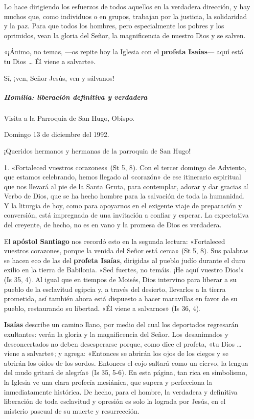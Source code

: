 \documentclass[]{article}
\let\oldsubparagraph\subparagraph
\renewcommand{\subparagraph}[1]{\oldsubparagraph{#1}\mbox{}}
\begin{document}
Lo hace dirigiendo los esfuerzos de todos aquellos en la verdadera
dirección, y hay muchos que, como individuos o en grupos, trabajan por
la justicia, la solidaridad y la paz. Para que todos los hombres, pero
especialmente los pobres y los oprimidos, vean la gloria del Señor, la
magnificencia de nuestro Dios y se salven.

«¡Ánimo, no temas, ---os repite hoy la Iglesia con el \textbf{profeta
Isaías}--- aquí está tu Dios \ldots{} Él viene a salvarte».

Sí, ¡ven, Señor Jesús, ven y sálvanos!

\subparagraph{Homilía: liberación definitiva y
verdadera}\label{homiluxeda-liberaciuxf3n-definitiva-y-verdadera}

Visita a la Parroquia de San Hugo, Obispo.

Domingo 13 de diciembre del 1992.

¡Queridos hermanos y hermanas de la parroquia de San Hugo!

1. «Fortaleced vuestros corazones» (St 5, 8). Con el tercer domingo de
Adviento, que estamos celebrando, hemos llegado al «corazón» de ese
itinerario espiritual que nos llevará al pie de la Santa Gruta, para
contemplar, adorar y dar gracias al Verbo de Dios, que se ha hecho
hombre para la salvación de toda la humanidad. Y la liturgia de hoy,
como para apoyarnos en el exigente viaje de preparación y conversión,
está impregnada de una invitación a confiar y esperar. La expectativa
del creyente, de hecho, no es en vano y la promesa de Dios es verdadera.

El \textbf{apóstol Santiago} nos recordó esto en la segunda lectura:
«Fortaleced vuestros corazones, porque la venida del Señor está cerca»
(St 5, 8). Sus palabras se hacen eco de las del \textbf{profeta Isaías},
dirigidas al pueblo judío durante el duro exilio en la tierra de
Babilonia. «Sed fuertes, no temáis. ¡He aquí vuestro Dios!» (Is 35, 4).
Al igual que en tiempos de Moisés, Dios intervino para liberar a su
pueblo de la esclavitud egipcia y, a través del desierto, llevarlos a la
tierra prometida, así también ahora está dispuesto a hacer maravillas en
favor de su pueblo, restaurando su libertad. «Él viene a salvarnos» (Is
36, 4).

\textbf{Isaías} describe un camino llano, por medio del cual los
deportados regresarán exultantes: verán la gloria y la magnificencia del
Señor. Los desanimados y desconcertados no deben desesperarse porque,
como dice el profeta, «tu Dios \ldots{} viene a salvarte»; y agrega:
«Entonces se abrirán los ojos de los ciegos y se abrirán los oídos de
los sordos. Entonces el cojo saltará como un ciervo, la lengua del mudo
gritará de alegría» (Is 35, 5-6). En esta página, tan rica en
simbolismo, la Iglesia ve una clara profecía mesiánica, que supera y
perfecciona la inmediatamente histórica. De hecho, para el hombre, la
verdadera y definitiva liberación de toda esclavitud y opresión es solo
la lograda por Jesús, en el misterio pascual de su muerte y
resurrección.
\end{document}
